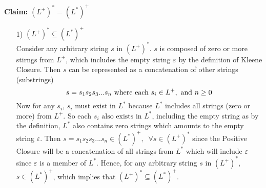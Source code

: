 \documentclass[a4paper]{exam}
\theoremstyle{definition}
\begin{document}
\begin{questions}
\begin{solution}
\textbf{Claim:} $(L^+)^*=(L^*)^+$ 
\vspace*{-2mm}
\begin{enumerate}[leftmargin=*]
  \item[1)] $ (L^+)^* \subseteq (L^*)^+ $ \\
  Consider any arbitrary string $s$ in $ (L^+)^* $. $s$ is composed of zero or more stirngs from $L^+$, which includes the empty string $\varepsilon$ by the definition of Kleene Closure. Then $s$ can be represented as a concatenation of other strings (substrings) \vspace*{-2mm}$$ s = s_1 s_2 s_3 ... s_n \text{ where each } s_i \in L^+, \text{ and } n \geq 0 \vspace*{-2mm}$$ 
  Now for any $s_i$, $ s_i $ must exist in $L^*$ because $L^*$ includes all strings (zero or more) from $ L^+ $. So each $s_i \text{ also exists in } L^*$, including the empty string as by the definition, $L^*$ also contains zero strings which amounts to the empty string $\varepsilon$. Then $ s = s_1 s_2 s_3 ... s_n \in (L^*)^+, \;\;\forall s \in (L^+)^*$ since the Positive Closure will be a concatenation of all strings from $L^*$ which will include $\varepsilon$ since $\varepsilon$ is a member of $L^*$. Hence, for any arbitrary string $s$ in $ (L^+)^* $, $s \in (L^*)^+$, which implies that $ (L^+)^* \subseteq (L^*)^+ $.

  

\end{enumerate}
\end{solution}
\end{questions}
\end{document}
